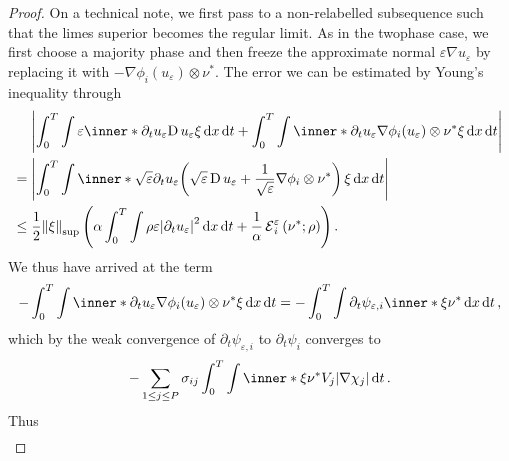 \begin{proof}
	On a technical note, we first pass to a non-relabelled subsequence such 
	that the limes superior becomes the regular limit.
	As in the twophase case, we first choose a majority phase and then freeze 
	the approximate normal $ \varepsilon \nabla u_{ \varepsilon } $ by 
	replacing it with $ - \nabla \phi_{ i } ( u_{ \varepsilon } ) \otimes \nu^{ 
	\ast } $. The error we can be estimated by Young's inequality through
	\begin{align}
		\notag
		& \abs{
			\int_{ 0 }^{ T }
			\int
			\varepsilon
			\inner*{ \partial_{  t } u_{ 
					\varepsilon } }{ \diff u_{ \varepsilon } \xi }
			\dd{ x }
			\dd{ t }
			+
			\int_{ 0 }^{ T }
			\int
			\inner*{ \partial_{ t } u_{ \varepsilon } }{ \nabla \phi_{ 
					i } ( u_{ \varepsilon } ) \otimes 
				\nu^{ \ast } \xi }
			\dd{ x }
			\dd{ t }
		}
		\\
		\notag
		={} &
		\abs{
			\int_{ 0 }^{ T }
			\int
			\inner*
			{ 
				\sqrt{ \varepsilon } \partial_{ t } u_{ \varepsilon } }{ 
				\left(
				\sqrt{ \varepsilon } \diff u_{ \varepsilon }
				+
				\frac{ 1 }{ \sqrt{ \varepsilon } }
				\nabla \phi_{ i } \otimes \nu^{ \ast } 
				\right)
				\xi 
			}
			\dd{ x }
			\dd{ t }
		}
		\\
		\label{first_error_for_velocity}
		\leq{} &
		\frac{ 1 }{ 2 }
		\norm{ \xi }_{ \mathrm{sup} }
		\left(
		\alpha 
		\int_{ 0 }^{ T }
		\int
		\rho \varepsilon 
		\abs{ \partial_{ t } u_{ \varepsilon } }^{ 2 }
		\dd{ x }
		\dd{ t }
		+
		\frac{ 1 }{ \alpha }
		\tilt_excess_{ i }^{ \varepsilon } \left( \nu^{ \ast } ; \rho \right)
		\right).
	\end{align}
	We thus have arrived at the term
	\begin{equation*}
		- \int_{ 0 }^{ T }
		\int
		\inner*{ \partial_{ t } u_{ \varepsilon } }{ \nabla \phi_{ i } 
			( u_{ \varepsilon } ) \otimes \nu^{ 
				\ast } \xi }
		\dd{ x }
		\dd{ t }
		= 
		- \int_{ 0 }^{ T }
		\int
		\partial_{ t } \psi_{ \varepsilon , i }
		\inner*{ \xi }{ \nu^{ \ast } }
		\dd{ x }
		\dd{ t },
	\end{equation*} 
	which by the weak convergence of $ \partial_{ t } \psi_{ \varepsilon,  i } 
	$ to $ \partial_{ t } \psi_{ i } $ converges to
	\begin{equation*}
		- \sum_{ 1 \leq j \leq P }
		\sigma_{ i j }
		\int_{ 0 }^{ T }
		\int
		\inner*{ \xi }{ \nu^{ \ast } }
		V_{ j }
		\abs{ \nabla \chi_{ j } }
		\dd{ t }.
	\end{equation*}
	Thus
	\begin{align*}

\end{align*}
\end{proof}
